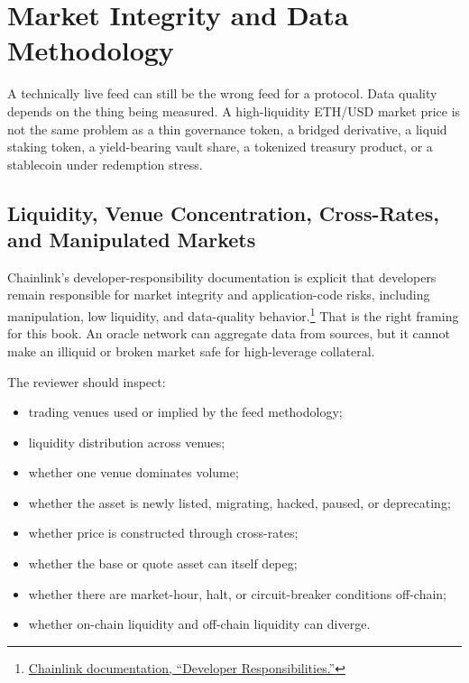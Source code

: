 \section{Market Integrity and Data Methodology}

A technically live feed can still be the wrong feed for a protocol. Data quality depends on the thing being measured. A high-liquidity ETH/USD market price is not the same problem as a thin governance token, a bridged derivative, a liquid staking token, a yield-bearing vault share, a tokenized treasury product, or a stablecoin under redemption stress.

\subsection{Liquidity, Venue Concentration, Cross-Rates, and Manipulated Markets}

Chainlink's developer-responsibility documentation is explicit that developers remain responsible for market integrity and application-code risks, including manipulation, low liquidity, and data-quality behavior.\footnote{\href{https://docs.chain.link/data-feeds/developer-responsibilities}{Chainlink documentation, ``Developer Responsibilities.''}} That is the right framing for this book. An oracle network can aggregate data from sources, but it cannot make an illiquid or broken market safe for high-leverage collateral.

The reviewer should inspect:

\begin{itemize}
\item trading venues used or implied by the feed methodology;
\item liquidity distribution across venues;
\item whether one venue dominates volume;
\item whether the asset is newly listed, migrating, hacked, paused, or deprecating;
\item whether price is constructed through cross-rates;
\item whether the base or quote asset can itself depeg;
\item whether there are market-hour, halt, or circuit-breaker conditions off-chain;
\item whether on-chain liquidity and off-chain liquidity can diverge.
\end{itemize}


